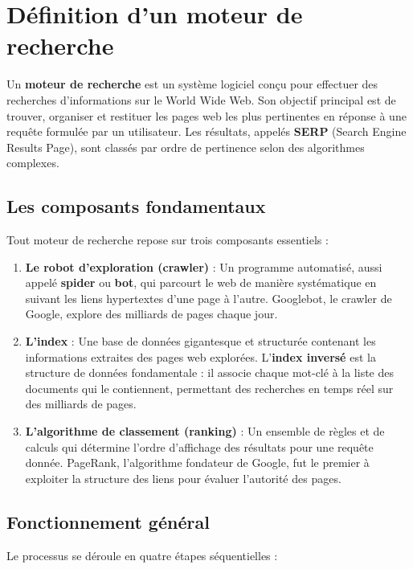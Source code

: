 \documentclass[12pt,a4paper,twoside]{report}
\newcommand{\keyword}[1]{\textbf{\textcolor{googleblue}{#1}}}
\begin{document}
\section*{Définition d'un moteur de recherche}

Un \keyword{moteur de recherche} est un système logiciel conçu pour effectuer des recherches d'informations sur le World Wide Web. Son objectif principal est de trouver, organiser et restituer les pages web les plus pertinentes en réponse à une requête formulée par un utilisateur. Les résultats, appelés \keyword{SERP} (Search Engine Results Page), sont classés par ordre de pertinence selon des algorithmes complexes.

\subsection*{Les composants fondamentaux}

Tout moteur de recherche repose sur trois composants essentiels :

\begin{enumerate}
    \item \textbf{Le robot d'exploration (crawler)} : Un programme automatisé, aussi appelé \keyword{spider} ou \keyword{bot}, qui parcourt le web de manière systématique en suivant les liens hypertextes d'une page à l'autre. Googlebot, le crawler de Google, explore des milliards de pages chaque jour.
    \item \textbf{L'index} : Une base de données gigantesque et structurée contenant les informations extraites des pages web explorées. L'\keyword{index inversé} est la structure de données fondamentale : il associe chaque mot-clé à la liste des documents qui le contiennent, permettant des recherches en temps réel sur des milliards de pages.
    \item \textbf{L'algorithme de classement (ranking)} : Un ensemble de règles et de calculs qui détermine l'ordre d'affichage des résultats pour une requête donnée. PageRank, l'algorithme fondateur de Google, fut le premier à exploiter la structure des liens pour évaluer l'autorité des pages.
\end{enumerate}

\subsection*{Fonctionnement général}

Le processus se déroule en quatre étapes séquentielles :
\end{document}
